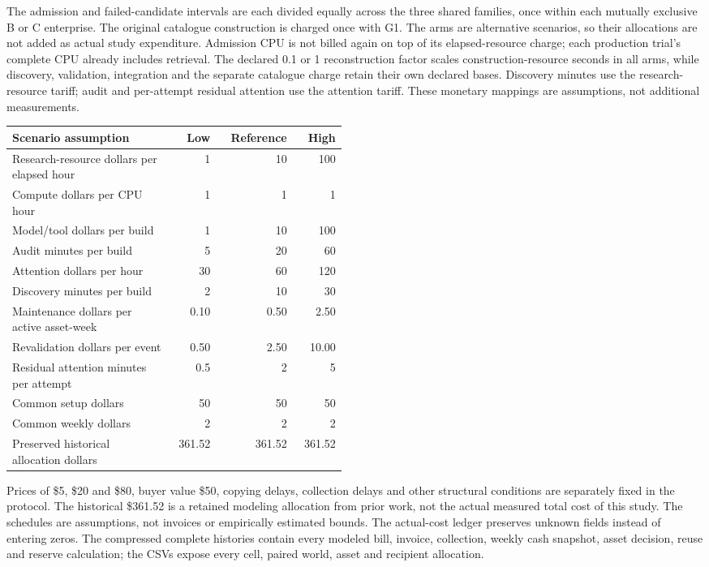 \documentclass[11pt,letterpaper]{article}
\begin{document}
The admission and failed-candidate intervals are each divided equally across the three shared families, once within each mutually exclusive B or C enterprise. The original catalogue construction is charged once with G1. The arms are alternative scenarios, so their allocations are not added as actual study expenditure. Admission CPU is not billed again on top of its elapsed-resource charge; each production trial's complete CPU already includes retrieval. The declared 0.1 or 1 reconstruction factor scales construction-resource seconds in all arms, while discovery, validation, integration and the separate catalogue charge retain their own declared bases. Discovery minutes use the research-resource tariff; audit and per-attempt residual attention use the attention tariff. These monetary mappings are assumptions, not additional measurements.

\begin{center}
\small
\begin{tabular}{p{0.48\linewidth}rrr}
\toprule
Scenario assumption & Low & Reference & High\\
\midrule
Research-resource dollars per elapsed hour & 1 & 10 & 100\\
Compute dollars per CPU hour & 1 & 1 & 1\\
Model/tool dollars per build & 1 & 10 & 100\\
Audit minutes per build & 5 & 20 & 60\\
Attention dollars per hour & 30 & 60 & 120\\
Discovery minutes per build & 2 & 10 & 30\\
Maintenance dollars per active asset-week & 0.10 & 0.50 & 2.50\\
Revalidation dollars per event & 0.50 & 2.50 & 10.00\\
Residual attention minutes per attempt & 0.5 & 2 & 5\\
Common setup dollars & 50 & 50 & 50\\
Common weekly dollars & 2 & 2 & 2\\
Preserved historical allocation dollars & 361.52 & 361.52 & 361.52\\
\bottomrule
\end{tabular}
\end{center}

Prices of \$5, \$20 and \$80, buyer value \$50, copying delays, collection delays and other structural conditions are separately fixed in the protocol. The historical \$361.52 is a retained modeling allocation from prior work, not the actual measured total cost of this study. The schedules are assumptions, not invoices or empirically estimated bounds. The actual-cost ledger preserves unknown fields instead of entering zeros. The compressed complete histories contain every modeled bill, invoice, collection, weekly cash snapshot, asset decision, reuse and reserve calculation; the CSVs expose every cell, paired world, asset and recipient allocation.
\end{document}
